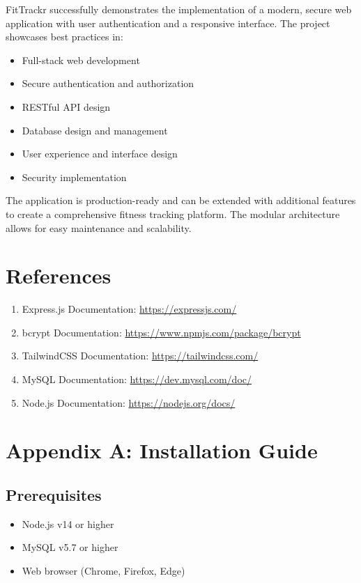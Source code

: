 \documentclass[12pt,a4paper]{article}
\begin{document}
FitTrackr successfully demonstrates the implementation of a modern, secure web application with user authentication and a responsive interface. The project showcases best practices in:

\begin{itemize}
    \item Full-stack web development
    \item Secure authentication and authorization
    \item RESTful API design
    \item Database design and management
    \item User experience and interface design
    \item Security implementation
\end{itemize}

The application is production-ready and can be extended with additional features to create a comprehensive fitness tracking platform. The modular architecture allows for easy maintenance and scalability.

\section{References}

\begin{enumerate}
    \item Express.js Documentation: \url{https://expressjs.com/}
    \item bcrypt Documentation: \url{https://www.npmjs.com/package/bcrypt}
    \item TailwindCSS Documentation: \url{https://tailwindcss.com/}
    \item MySQL Documentation: \url{https://dev.mysql.com/doc/}
    \item Node.js Documentation: \url{https://nodejs.org/docs/}
\end{enumerate}

\appendix
\section{Appendix A: Installation Guide}

\subsection{Prerequisites}
\begin{itemize}
    \item Node.js v14 or higher
    \item MySQL v5.7 or higher
    \item Web browser (Chrome, Firefox, Edge)
\end{itemize}
\end{document}
